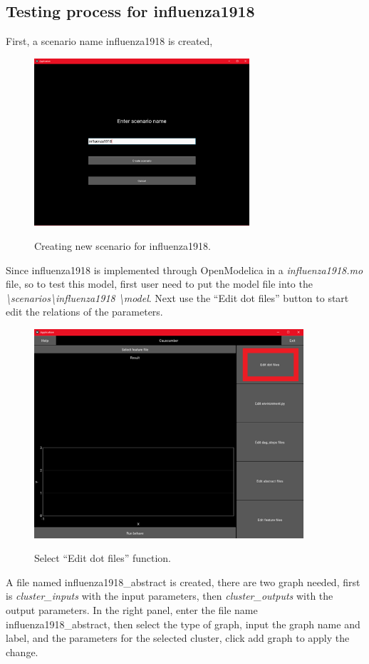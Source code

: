 \subsection{Testing process for influenza1918}
First, a scenario name influenza1918 is created, 
\begin{figure}[H]
	\centering
	\includegraphics[width=8cm]{figures/influenzaTestProcess1.png}\\
	\caption{Creating new scenario for influenza1918.}
	\label{fig:figure19}
\end{figure}
Since influenza1918 is implemented through OpenModelica in a \textsl{influenza1918.mo} file, so to test this model, first user need to put the model file into the \textsl{\textbackslash scenarios\textbackslash influenza1918 \textbackslash model}. Next use the “Edit dot files” button to start edit the relations of the parameters.
\begin{figure}[H]
	\centering
	\includegraphics[width=10cm]{figures/influenzaTestProcess2.png}\\
	\caption{Select “Edit dot files” function.}
	\label{fig:figure20}
\end{figure}
A file named influenza1918\_abstract is created, there are two graph needed, first is \textsl{cluster\_inputs} with the input parameters, then \textsl{cluster\_outputs} with the output parameters. In the right panel, enter the file name influenza1918\_abstract, then select the type of graph, input the graph name and label, and the parameters for the selected cluster, click add graph to apply the change.

